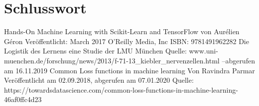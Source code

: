 \documentclass{article}
\begin{document}
\section{Schlusswort}
\newpage
\begin{thebibliography}{99}
	Hands-On Machine Learning with Scikit-Learn and TensorFlow\newline
	von Aurélien Géron\newline
	Veröffentlicht: March 2017 O'Reilly Media, Inc\newline
	ISBN: 9781491962282
	Die Logistik des Lernens eine Studie der LMU München\newline
	Quelle: www.uni-muenchen.de/forschung/news/2013/\newline f-71-13\_kiebler\_nervenzellen.html --abgerufen am 16.11.2019
	Common Loss functions in machine learning\newline
	Von Ravindra Parmar\newline
	Veröffentlicht am 02.09.2018, abgerufen am 07.01.2020\newline
	Quelle: https://towardsdatascience.com/common-loss-functions-in-machine-learning-46af0ffc4d23 
	
\end{thebibliography}
\listoffigures
\end{document}
